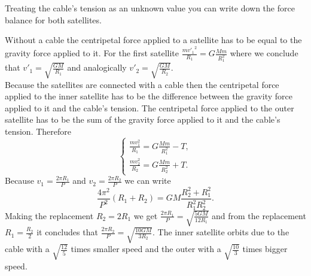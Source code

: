 {\ifEngHint
Treating the cable’s tension as an unknown value you can write down the force balance for both satellites.
\fi


\ifEngSolution
Without a cable the centripetal force applied to a satellite has to be equal to the gravity force applied to it. For the first satellite $\frac{{mv'_1}^2}{R_1}=G\frac{Mm}{R_1^2}$ where we conclude that $v'_1=\sqrt{\frac{GM}{R_1}}$ and analogically $v'_2=\sqrt{\frac{GM}{R_2}}$.\\
Because the satellites are connected with a cable then the centripetal force applied to the inner satellite has to be the difference between the gravity force applied to it and the cable’s tension. The centripetal force applied to the outer satellite has to be the sum of the gravity force applied to it and the cable’s tension. Therefore
$$\begin{cases}
\frac{mv_1^2}{R_1}=G\frac{Mm}{R_1^2}-T,\\
\frac{mv_2^2}{R_2}=G\frac{Mm}{R_2^2}+T.
\end{cases}$$
Because $v_1=\frac{2\pi R_1}{P}$ and $v_2=\frac{2\pi R_2}{P}$ we can write 
$$\frac{4\pi^2}{P^2}\left(R_1+R_2\right)=GM\frac{R_2^2+R_1^2}{R_1^2R_2^2}.$$
Making the replacement $R_2=2R_1$ we get $\frac{2\pi R_1}{P}=\sqrt{\frac{5GM}{12R_1}}$ and from the replacement $R_1=\frac{R_2}{2}$ it concludes that $\frac{2\pi R_2}{P}=\sqrt{\frac{10GM}{3R_2}}$. The inner satellite orbits due to the cable with a $\sqrt{\frac{12}{5}}$ times smaller speed and the outer with a $\sqrt{\frac{10}{3}}$ times bigger speed.
\fi
}